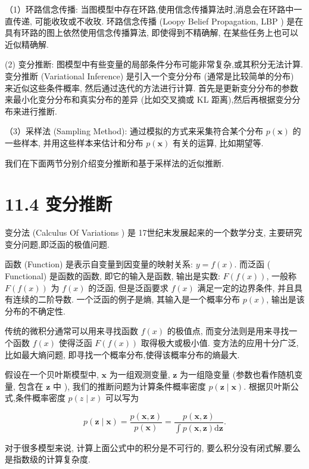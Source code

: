 \documentclass[10pt]{article}
\begin{document}
（1）环路信念传播: 当图模型中存在环路,使用信念传播算法时,消息会在环路中一直传递, 可能收玫或不收玫. 环路信念传播 (Loopy Belief Propagation, LBP ) 是在具有环路的图上依然使用信念传播算法, 即使得到不精确解, 在某些任务上也可以近似精确解.

(2) 变分推断: 图模型中有些变量的局部条件分布可能非常复杂,或其积分无法计算. 变分推断 (Variational Inference) 是引入一个变分分布 (通常是比较简单的分布) 来近似这些条件概率, 然后通过迭代的方法进行计算. 首先是更新变分分布的参数来最小化变分分布和真实分布的差异 (比如交叉摘或 KL 距离),然后再根据变分分布来进行推断.

（3）采样法 (Sampling Method): 通过模拟的方式来采集符合某个分布 $p(\boldsymbol{x})$ 的一些样本, 并用这些样本来估计和分布 $p(\boldsymbol{x})$ 有关的运算, 比如期望等.

我们在下面两节分别介绍变分推断和基于采样法的近似推断.

\section*{11.4 变分推断}
变分法 (Calculus Of Variations ) 是 17世纪末发展起来的一个数学分支, 主要研究变分问题,即泛函的极值问题.

函数 (Function) 是表示自变量到因变量的映射关系: $y=f(x)$. 而泛函 ( Functional) 是函数的函数, 即它的输入是函数, 输出是实数: $F(f(x))$, 一般称 $F(f(x))$ 为 $f(x)$ 的泛函, 但是泛函要求 $f(x)$ 满足一定的边界条件, 并且具有连续的二阶导数. 一个泛函的例子是熵, 其输入是一个概率分布 $p(x)$, 输出是该分布的不确定性.

传统的微积分通常可以用来寻找函数 $f(x)$ 的极值点, 而变分法则是用来寻找一个函数 $f(x)$ 使得泛函 $F(f(x))$ 取得极大或极小值. 变方法的应用十分广泛,比如最大熵问题, 即寻找一个概率分布,使得该概率分布的熵最大.

假设在一个贝叶斯模型中, $\boldsymbol{x}$ 为一组观测变量, $\boldsymbol{z}$ 为一组隐变量 (参数也看作随机变量, 包含在 $\boldsymbol{z}$ 中 ), 我们的推断问题为计算条件概率密度 $p(\boldsymbol{z} \mid \boldsymbol{x})$. 根据贝叶斯公式,条件概率密度 $p(z \mid x)$ 可以写为


\begin{equation*}
p(\boldsymbol{z} \mid \boldsymbol{x})=\frac{p(\boldsymbol{x}, \boldsymbol{z})}{p(\boldsymbol{x})}=\frac{p(\boldsymbol{x}, \boldsymbol{z})}{\int p(\boldsymbol{x}, \boldsymbol{z}) \mathrm{d} \boldsymbol{z}} . \tag{11.81}
\end{equation*}


对于很多模型来说, 计算上面公式中的积分是不可行的, 要么积分没有闭式解,要么是指数级的计算复杂度.
\end{document}

